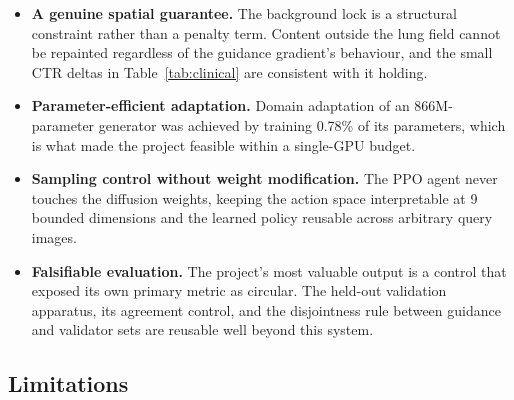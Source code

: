 \begin{itemize}[leftmargin=*]
  \item \textbf{A genuine spatial guarantee.} The background lock is a
        structural constraint rather than a penalty term. Content outside
        the lung field cannot be repainted regardless of the guidance
        gradient's behaviour, and the small CTR deltas in
        Table~\ref{tab:clinical} are consistent with it holding.
  \item \textbf{Parameter-efficient adaptation.} Domain adaptation of an
        866M-parameter generator was achieved by training 0.78\% of its
        parameters, which is what made the project feasible within a
        single-GPU budget.
  \item \textbf{Sampling control without weight modification.} The PPO
        agent never touches the diffusion weights, keeping the action
        space interpretable at 9 bounded dimensions and the learned
        policy reusable across arbitrary query images.
  \item \textbf{Falsifiable evaluation.} The project's most valuable
        output is a control that exposed its own primary metric as
        circular. The held-out validation apparatus, its agreement
        control, and the disjointness rule between guidance and validator
        sets are reusable well beyond this system.
\end{itemize}

\subsection{Limitations}
\label{sec:limitations}

